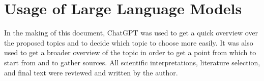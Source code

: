 \chapter{Usage of Large Language Models}\label{cha:LLMs}

In the making of this document, ChatGPT was used to get a quick overview over the proposed topics and to decide which topic to choose more easily.
It was also used to get a broader overview of the topic in order to get a point from which to start from and to gather sources. 
All scientific interpretations, literature selection, and final text were reviewed and written by the author.